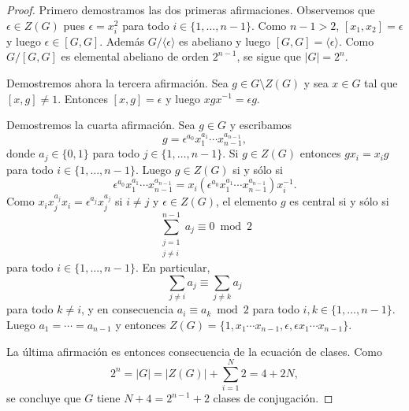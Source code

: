 \begin{proof}
	Primero demostramos las dos primeras afirmaciones. 
	Observemos que $\epsilon\in Z(G)$ pues $\epsilon=x_i^2$ para todo
	$i\in\{1,\dots,n-1\}$. Como $n-1>2$, $[x_1,x_2]=\epsilon$ y luego
	$\epsilon\in [G,G]$. Además $G/\langle\epsilon\rangle$ es abeliano y luego
	$[G,G]=\langle \epsilon\rangle$. Como $G/[G,G]$ es elemental abeliano de
	orden $2^{n-1}$, se sigue que $|G|=2^n$. 

	Demostremos ahora la tercera afirmación. Sea $g\in G\setminus Z(G)$ y sea
	$x\in G$ tal que $[x,g]\ne 1$. Entonces $[x,g]=\epsilon$ y luego
	$xgx^{-1}=\epsilon g$. 

	Demostremos la cuarta afirmación. Sea $g\in G$ y escribamos
	\[
		g=\epsilon^{a_0}x_1^{a_1}\cdots x_{n-1}^{a_{n-1}},
	\]
	donde $a_j\in\{0,1\}$ para todo $j\in\{1,\dots,n-1\}$. Si $g\in Z(G)$ entonces $gx_i=x_ig$ para todo $i\in\{1,\dots,n-1\}$. Luego
	$g\in Z(G)$ si y sólo si 
	\[
		\epsilon^{a_0}x_1^{a_1}\cdots x_{n-1}^{a_{n-1}}=x_i(\epsilon^{a_0}x_1^{a_1}\cdots x_{n-1}^{a_{n-1}})x_i^{-1}.
	\]
	Como $x_ix_j^{a_j}x_i=\epsilon^{a_j}x_j^{a_j}$ si $i\ne j$ y $\epsilon\in Z(G)$, el elemento $g$ es central si y sólo si 
	\[
		\sum_{\substack{j=1\\j\ne i}}^{n-1}a_j\equiv 0\bmod 2
	\]
	para todo $i\in\{1,\dots,n-1\}$. En particular, 
	\[
	\sum_{j\ne i}a_j\equiv \sum_{j\ne k}a_j
	\]
	para todo $k\ne i$, y en consecuencia $a_i\equiv a_k\bmod 2$ para todo
	$i,k\in\{1,\dots,n-1\}$. Luego $a_1=\cdots=a_{n-1}$ y entonces 
	$Z(G)=\{1,x_1\cdots x_{n-1},\epsilon,\epsilon x_1\cdots
	x_{n-1}\}$. 
	
	La última afirmación es entonces consecuencia de la ecuación de clases. Como
	\[
		2^n=|G|=|Z(G)|+\sum_{i=1}^N2=4+2N,
	\]
	se concluye que $G$ tiene $N+4=2^{n-1}+2$ clases de conjugación.
\end{proof}

